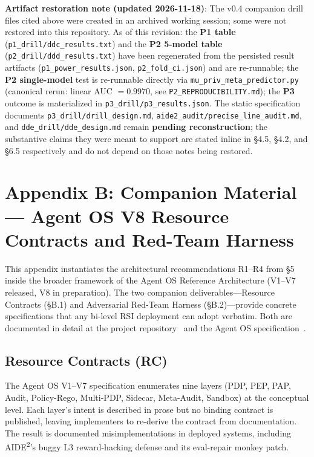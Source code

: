 \documentclass{article}
\theoremstyle{definition}
\begin{document}
\textbf{Artifact restoration note (updated 2026-11-18)}: The v0.4 companion drill files cited above were created in an archived working session; some were not restored into this repository. As of this revision: the \textbf{P1 table} (\texttt{p1\_drill/ddc\_results.txt}) and the \textbf{P2 5-model table} (\texttt{p2\_drill/ddd\_results.txt}) have been regenerated from the persisted result artifacts (\texttt{p1\_power\_results.json}, \texttt{p2\_fold\_ci.json}) and are re-runnable; the \textbf{P2 single-model} test is re-runnable directly via \texttt{mu\_priv\_meta\_predictor.py} (canonical rerun: linear AUC $=0.9970$, see \texttt{P2\_REPRODUCIBILITY.md}); the \textbf{P3} outcome is materialized in \texttt{p3\_drill/p3\_results.json}. The static specification documents \texttt{p3\_drill/drill\_design.md}, \texttt{aide2\_audit/precise\_line\_audit.md}, and \texttt{dde\_drill/dde\_design.md} remain \textbf{pending reconstruction}; the substantive claims they were meant to support are stated inline in \S4.5, \S4.2, and \S6.5 respectively and do not depend on those notes being restored.

\appendix


\section*{Appendix B: Companion Material --- Agent OS V8 Resource Contracts and Red-Team Harness}

This appendix instantiates the architectural recommendations R1--R4 from \S5 inside the broader framework of the Agent OS Reference Architecture (V1--V7 released, V8 in preparation). The two companion deliverables---Resource Contracts (\S B.1) and Adversarial Red-Team Harness (\S B.2)---provide concrete specifications that any bi-level RSI deployment can adopt verbatim. Both are documented in detail at the project repository~\cite{anon2026bi} and the Agent OS specification~\cite{anon2026aosv8}.

\subsection{Resource Contracts (RC)}

The Agent OS V1--V7 specification enumerates nine layers (PDP, PEP, PAP, Audit, Policy-Rego, Multi-PDP, Sidecar, Meta-Audit, Sandbox) at the conceptual level. Each layer's intent is described in prose but no binding contract is published, leaving implementers to re-derive the contract from documentation. The result is documented misimplementations in deployed systems, including AIDE\textsuperscript{2}'s buggy L3 reward-hacking defense and its eval-repair monkey patch.
\end{document}
